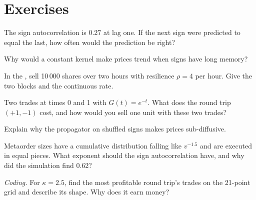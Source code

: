 \section{Exercises}

\begin{exercise}[$\star$]\label{exo:mx:transient-impact-and-propagator-models:1}
The sign autocorrelation is 0.27 at lag one. If the next sign were predicted to equal the last, how often would the prediction be right?
\end{exercise}

\begin{exercise}[$\star$]\label{exo:mx:transient-impact-and-propagator-models:2}
Why would a constant kernel make prices trend when signs have long memory?
\end{exercise}

\begin{exercise}[$\star$]\label{exo:mx:transient-impact-and-propagator-models:3}
In the , sell 10\,000 shares over two hours with resilience $\rho=4$ per hour. Give the two blocks and the continuous rate.
\end{exercise}

\begin{exercise}[$\star\star$]\label{exo:mx:transient-impact-and-propagator-models:4}
Two trades at times 0 and 1 with $G(t)=e^{-t}$. What does the round trip $(+1,-1)$ cost, and how would you sell one unit with these two trades?
\end{exercise}

\begin{exercise}[$\star\star$]\label{exo:mx:transient-impact-and-propagator-models:5}
Explain why the propagator on shuffled signs makes prices sub-diffusive.
\end{exercise}

\begin{exercise}[$\star\star$]\label{exo:mx:transient-impact-and-propagator-models:6}
Metaorder sizes have a cumulative distribution falling like $v^{-1.5}$ and are executed in equal pieces. What exponent should the sign autocorrelation
have, and why did the simulation find 0.62?
\end{exercise}

\begin{exercise}[$\star\star\star$]\label{exo:mx:transient-impact-and-propagator-models:7}
\emph{Coding.} For $\kappa=2.5$, find the most profitable round trip's trades on the 21-point grid and describe its shape. Why does it earn money?
\end{exercise}

